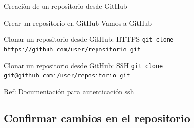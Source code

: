 \documentclass{beamer}
\begin{document}
\begin{frame}[containsverbatim]{Creación de un repositorio desde GitHub}

\begin{block}{Crear un repositorio en GitHub}
  Vamos a \href{https://github.com}{GitHub} 
\end{block}


\begin{block}{Clonar un repositorio desde GitHub: HTTPS}
  \small
  \texttt{git clone https://github.com/user/repositorio.git .}
\end{block}

\begin{block}{Clonar un repositorio desde GitHub: SSH}
  \small
  \texttt{git clone git@github.com:/user/repositorio.git .}
\end{block}

Ref: Documentación para \href{https://docs.github.com/es/authentication/connecting-to-github-with-ssh/about-ssh}{autenticación ssh}

\end{frame}



\subsection {Confirmar cambios en el repositorio}
\end{document}
